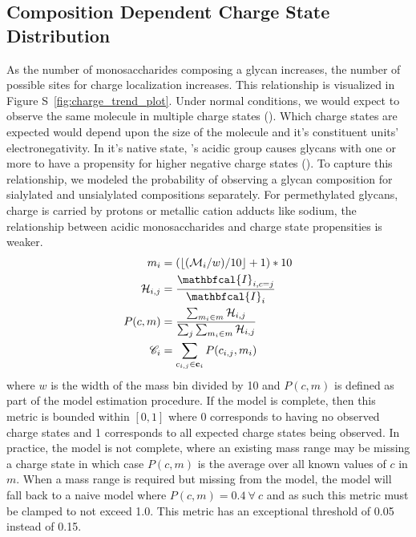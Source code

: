     \subsection{Composition Dependent Charge State Distribution}
        As the number of monosaccharides composing a glycan increases, the number of possible sites
        for charge localization increases. This relationship is visualized in Figure S~\ref{fig:charge_trend_plot}.
        Under normal conditions, we would expect to observe the same molecule in multiple charge states
        (\cite{Maxwell2012}). Which charge states are expected would depend upon the size of the molecule
        and it's constituent units' electronegativity. In it's native state, 's
        acidic group causes glycans with one or more  to have a propensity for
        higher negative charge states (\cite{Varki2009}). To capture this relationship, we modeled the
        probability of observing a glycan composition for sialylated and unsialylated compositions
        separately. For permethylated glycans, charge is carried by protons or metallic cation adducts
        like sodium, the relationship between acidic monosaccharides and charge state propensities is
        weaker.
        \begin{align}
            m_i &= (\floor*{(\mathcal{M}_i / w) / 10} + 1) * 10 \nonumber\\
            \mathcal{H}_{i,j} &= \frac{
                \mathbfcal{I}_{i, c=j}}{\mathbfcal{I}_i} \nonumber\\
            P(c, m) &= \frac{\sum_{m_i \in m} \mathcal{H}_{i, j}}{
                \sum_{j}{\sum_{m_i \in m} \mathcal{H}_{i, j}}} \nonumber\\
            \mathscr{C}_i &= \sum_{c_{i, j} \in \mathbf{c}_i}{P(c_{i, j}, m_i)}
        \end{align}
        where $w$ is the width of the mass bin divided by 10 and $P(c, m)$ is defined as
        part of the model estimation procedure. If the model is complete, then this metric is
        bounded within $[0, 1]$ where 0 corresponds to having no observed charge states and 1
        corresponds to all expected charge states being observed. In practice, the model is not
        complete, where an existing mass range may be missing a charge state in which case
        $P(c, m)$ is the average over all known values of $c$ in $m$. When a mass range is
        required but missing from the model, the model will fall back to a naive model where
        $P(c, m) = 0.4 \ \forall \ c$ and as such this metric must be clamped to not exceed
        1.0. This metric has an exceptional threshold of 0.05 instead of 0.15.

